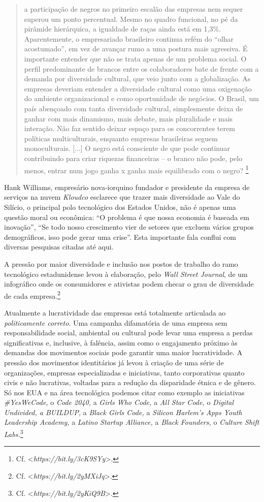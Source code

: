 \begin{quote}
a participação de negros no primeiro escalão das empresas nem sequer
superou um ponto percentual. Mesmo no quadro funcional, no pé da
pirâmide hierárquica, a igualdade de raças ainda está em 1,3\%.
Aparentemente, o empresariado brasileiro continua refém do ``olhar
acostumado'', em vez de avançar rumo a uma postura mais agressiva. É
importante entender que não se trata apenas de um problema social. O
perfil predominante de brancos entre os colaboradores bate de frente com
a demanda por diversidade cultural, que veio junto com a globalização.
As empresas deveriam entender a diversidade cultural como uma oxigenação
do ambiente organizacional e como oportunidade de negócios. O Brasil, um
país abençoado com tanta diversidade cultural, simplesmente deixa de
ganhar com mais dinamismo, mais debate, mais pluralidade e mais
interação. Não faz sentido deixar espaço para os concorrentes terem
políticas multiculturais, enquanto empresas brasileiras seguem
monoculturais. {[}...{]} O negro está consciente de que pode continuar
contribuindo para criar riquezas financeiras -- o branco não pode, pelo
menos, entrar num jogo ganha x ganha mais equilibrado com o negro?
\footnote{Cf. \textless{}\emph{https://bit.ly/3cK9SYy}\textgreater{}.}
\end{quote}

Hank Williams, empresário nova-iorquino fundador e presidente da empresa
de serviços na nuvem \emph{Kloudco} esclarece que trazer mais
diversidade ao Vale do Silício, o principal polo tecnológico dos Estados
Unidos, não é apenas uma questão moral ou econômica: ``O problema é que
nossa economia é baseada em inovação'', ``Se todo nosso crescimento vier
de setores que excluem vários grupos demográficos, isso pode gerar uma
crise''. Esta importante fala conflui com diversas pesquisas citadas até
aqui.

A pressão por maior diversidade e inclusão nos postos de trabalho do
ramo tecnológico estadunidense levou à elaboração, pelo \emph{Wall
Street Journal}, de um infográfico onde os consumidores e ativistas
podem checar o grau de diversidade de cada empresa.\footnote{Cf.
  \textless{}\emph{https://bit.ly/2yMXiJq}\textgreater{}.}

Atualmente a lucratividade das empresas está totalmente articulada ao
\emph{politicamente correto}. Uma campanha difamatória de uma empresa
sem responsabilidade social, ambiental ou cultural pode levar uma
empresa a perdas significativas e, inclusive, à falência, assim como o
engajamento próximo às demandas dos movimentos sociais pode garantir uma
maior lucratividade. A pressão dos movimentos identitários já levou à
criação de uma série de organizações, empresas especializadas e
iniciativas, tanto corporativas quanto civis e não lucrativas, voltadas
para a redução da disparidade étnica e de gênero. Só nos EUA e na área
tecnológica podemos citar como exemplo as iniciativas
\emph{\#YesWeCode,} o \emph{Code 2040,} a \emph{Girls Who Code,} a
\emph{All Star Code,} o \emph{Digital Undivided, a BUILDUP,} a
\emph{Black Girls Code,} a \emph{Silicon Harlem's Apps Youth Leadership
Academy,} a \emph{Latino Startup Alliance,} a \emph{Black Founders,} o
\emph{Culture Shift Labs.}\footnote{Cf.
  \textless{}\emph{https://bit.ly/2yKiQ9B}\textgreater{}.}

